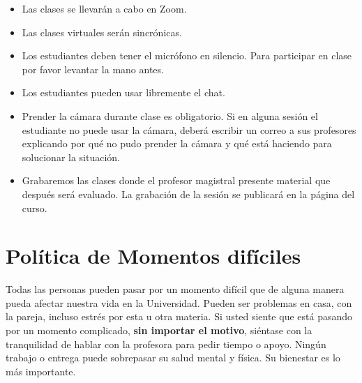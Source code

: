 \documentclass[11pt]{article}
\begin{document}
\begin{itemize}
\item Las clases se llevarán a cabo en Zoom.
\item Las clases virtuales serán sincrónicas.
\item Los estudiantes deben tener el micrófono en silencio. Para participar en clase por favor levantar la mano antes.
\item Los estudiantes pueden usar libremente el chat.
\item Prender la cámara durante clase es obligatorio. Si en alguna sesión el estudiante no puede usar la cámara, deberá escribir un correo a sus profesores explicando por qué no pudo prender la cámara y qué está haciendo para solucionar la situación.
\item Grabaremos las clases donde el profesor magistral presente material que después será evaluado. La grabación de la sesión se publicará en la página del curso.
\end{itemize}

\section{Política de Momentos difíciles}

Todas las personas pueden pasar por un momento difícil que de alguna manera pueda afectar nuestra vida en la Universidad. Pueden ser problemas en casa, con la pareja, incluso estrés por esta u otra materia. Si usted siente que está pasando por un momento complicado, {\bf sin importar el motivo}, siéntase con la tranquilidad de hablar con la profesora para pedir tiempo o apoyo. Ningún trabajo o entrega puede sobrepasar su salud mental y física. Su bienestar es lo más importante.
\end{document}
